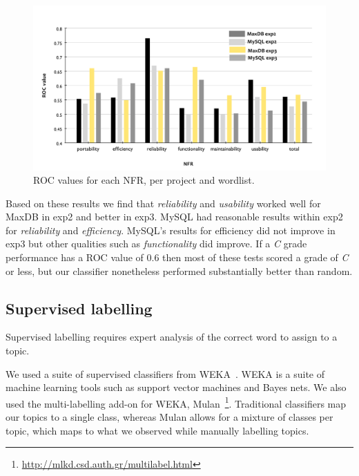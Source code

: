 \documentclass[]{sig-alternate}
\begin{document}
\begin{figure}
  \centering
 \includegraphics[width=\textwidth]{figures/unsupervised-bar}
 \caption{ROC values for each NFR, per project and wordlist.}
  \label{fig:maxdb-unsup-results}
\end{figure}


Based on these results we find that \emph{reliability} and \emph{usability} worked well for MaxDB in \textsf{exp2} and better in \textsf{exp3}. 
MySQL had reasonable results within \textsf{exp2} for \emph{reliability} and \emph{efficiency}. 
MySQL's results for efficiency did not improve in \textsf{exp3} but other qualities such as \emph{functionality} did improve. 
If a \emph{C} grade performance has a ROC value of $0.6$ then most of these tests scored a grade of \emph{C} or less, but our classifier nonetheless performed substantially better than random.


\subsection{Supervised labelling}
\label{sec:suplearn}
Supervised labelling requires expert analysis of the correct word to assign to a topic. %

We used a suite of supervised classifiers from WEKA~\cite{weka09}. WEKA is a suite of machine learning tools such as support vector machines and Bayes nets. We also used the multi-labelling add-on for WEKA, Mulan~\cite{mulan}\footnote{\url{http://mlkd.csd.auth.gr/multilabel.html}}. Traditional classifiers map our topics to a single class, whereas Mulan allows for a mixture of classes per topic, which maps to what we observed while manually labelling topics.
\end{document}
